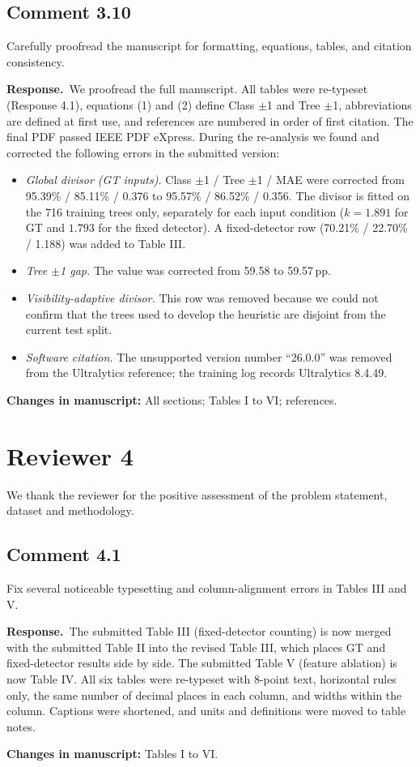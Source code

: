 \documentclass[10pt,a4paper]{article}
\newcommand{\resp}{\textbf{Response.}\ }
\newcommand{\changes}[1]{\par\textbf{Changes in manuscript:} #1}
\newcommand{\pp}{\,pp}
\begin{document}
\subsection{Comment 3.10}
\begin{cmt}
Carefully proofread the manuscript for formatting, equations, tables, and citation
consistency.
\end{cmt}
\resp We proofread the full manuscript. All tables were re-typeset (Response 4.1),
equations (1) and (2) define Class $\pm$1 and Tree $\pm$1, abbreviations are defined at
first use, and references are numbered in order of first citation. The final PDF passed
IEEE PDF eXpress. During the re-analysis we found and corrected the following errors in
the submitted version:
\begin{itemize}
\item \emph{Global divisor (GT inputs).} Class $\pm$1 / Tree $\pm$1 / MAE were corrected
  from 95.39\% / 85.11\% / 0.376 to 95.57\% / 86.52\% / 0.356. The divisor is fitted on
  the 716 training trees only, separately for each input condition ($k=1.891$ for GT
  and $1.793$ for the fixed detector). A fixed-detector row (70.21\% / 22.70\% / 1.188)
  was added to Table III.
\item \emph{Tree $\pm$1 gap.} The value was corrected from 59.58 to 59.57\pp.
\item \emph{Visibility-adaptive divisor.} This row was removed because we could not
  confirm that the trees used to develop the heuristic are disjoint from the current
  test split.
\item \emph{Software citation.} The unsupported version number ``26.0.0'' was removed
  from the Ultralytics reference; the training log records Ultralytics 8.4.49.
\end{itemize}
\changes{All sections; Tables I to VI; references.}

\section{Reviewer 4}

We thank the reviewer for the positive assessment of the problem statement, dataset and
methodology.

\subsection{Comment 4.1}
\begin{cmt}
Fix several noticeable typesetting and column-alignment errors in Tables III and V.
\end{cmt}
\resp The submitted Table III (fixed-detector counting) is now merged with the submitted
Table II into the revised Table III, which places GT and fixed-detector results side by
side. The submitted Table V (feature ablation) is now Table IV. All six tables were
re-typeset with 8-point text, horizontal rules only, the same number of decimal places
in each column, and widths within the column. Captions were shortened, and units and
definitions were moved to table notes.
\changes{Tables I to VI.}
\end{document}
